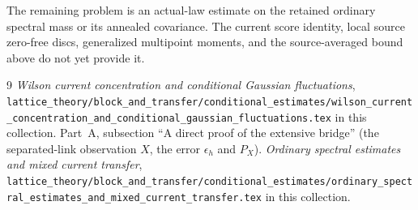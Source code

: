 \documentclass[
  11pt,
]{article}
\begin{document}
The remaining problem is an actual-law estimate on the retained ordinary
spectral mass or its annealed covariance. The current score identity,
local source zero-free discs, generalized multipoint moments, and the
source-averaged bound above do not yet provide it.

\begin{thebibliography}{9}
 \emph{Wilson current concentration and conditional Gaussian fluctuations}, \texttt{lattice\_theory/block\_and\_transfer/conditional\_estimates/wilson\_current\_concentration\_and\_conditional\_gaussian\_fluctuations.tex} in this collection. Part~A, subsection ``A direct proof of the extensive bridge'' (the separated-link observation $X$, the error $\epsilon_h$ and $P_X$).
 \emph{Ordinary spectral estimates and mixed current transfer}, \texttt{lattice\_theory/block\_and\_transfer/conditional\_estimates/ordinary\_spectral\_estimates\_and\_mixed\_current\_transfer.tex} in this collection.
\end{thebibliography}

\newpage
\end{document}

